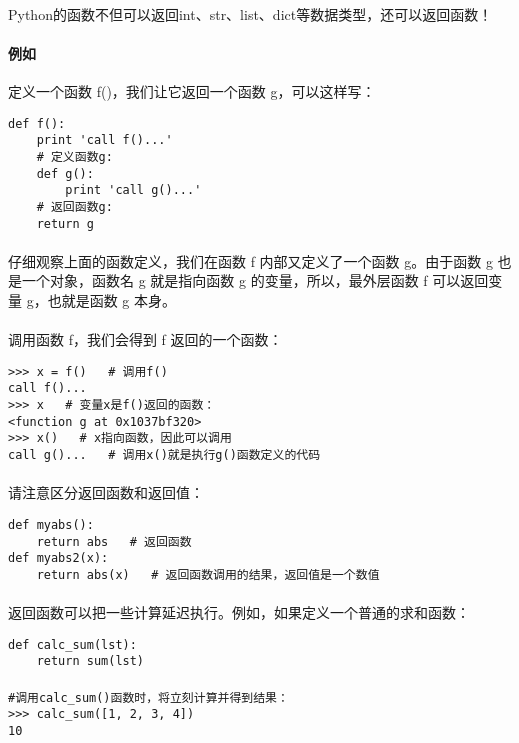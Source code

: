 \documentclass{article}
\begin{document}
\begin{CJK}{UTF8}{gbsn}
\paragraph{}
Python的函数不但可以返回int、str、list、dict等数据类型，还可以返回函数！
\paragraph{例如}
定义一个函数 f()，我们让它返回一个函数 g，可以这样写：
\begin{verbatim}
def f():
    print 'call f()...'
    # 定义函数g:
    def g():
        print 'call g()...'
    # 返回函数g:
    return g
\end{verbatim}
\paragraph{}
仔细观察上面的函数定义，我们在函数 f 内部又定义了一个函数 g。由于函数 g 也是一个对象，函数名 g 就是指向函数 g 的变量，所以，最外层函数 f 可以返回变量 g，也就是函数 g 本身。
\paragraph{}
调用函数 f，我们会得到 f 返回的一个函数：
\begin{verbatim}
>>> x = f()   # 调用f()
call f()...
>>> x   # 变量x是f()返回的函数：
<function g at 0x1037bf320>
>>> x()   # x指向函数，因此可以调用
call g()...   # 调用x()就是执行g()函数定义的代码
\end{verbatim}
\paragraph{}
请注意区分返回函数和返回值：
\begin{verbatim}
def myabs():
    return abs   # 返回函数
def myabs2(x):
    return abs(x)   # 返回函数调用的结果，返回值是一个数值
\end{verbatim}
\paragraph{}
返回函数可以把一些计算延迟执行。例如，如果定义一个普通的求和函数：
\begin{verbatim}
def calc_sum(lst):
    return sum(lst)
\end{verbatim}
\paragraph{}
\begin{verbatim}
#调用calc_sum()函数时，将立刻计算并得到结果：
>>> calc_sum([1, 2, 3, 4])
10
\end{verbatim}

\end{CJK}
\end{document}

